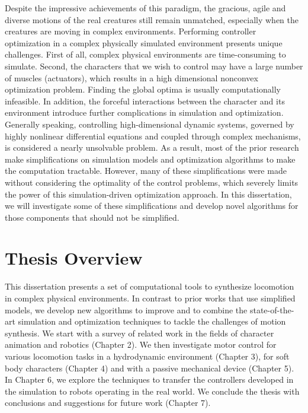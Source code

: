Despite the impressive achievements of this paradigm, the gracious, agile and diverse motions of the real creatures still remain unmatched, especially when the creatures are moving in complex environments. Performing controller optimization in a complex physically simulated environment presents unique challenges. First of all, complex physical environments are time-consuming to simulate. Second, the characters that we wish to control may have a large number of muscles (actuators), which results in a high dimensional nonconvex optimization problem. Finding the global optima is usually computationally infeasible. In addition, the forceful interactions between the character and its environment introduce further complications in simulation and optimization. Generally speaking, controlling high-dimensional dynamic systems, governed by highly nonlinear differential equations and coupled through complex mechanisms, is considered a nearly unsolvable problem. As a result, most of the prior research make simplifications on simulation models and optimization algorithms to make the computation tractable. However, many of these simplifications were made without considering the optimality of the control problems, which severely limits the power of this simulation-driven optimization approach. In this dissertation, we will investigate some of these simplifications and develop novel algorithms for those components that should not be simplified. 


\section{Thesis Overview}

This dissertation presents a set of computational tools to synthesize locomotion in complex physical environments. In contrast to prior works that use simplified models, we develop new algorithms to improve and to combine the state-of-the-art simulation and optimization techniques to tackle the challenges of motion synthesis. We start with a survey of related work in the fields of character animation and robotics (Chapter 2). We then investigate motor control for various locomotion tasks in a hydrodynamic environment (Chapter 3), for soft body characters (Chapter 4) and with a passive mechanical device (Chapter 5). In Chapter 6, we explore the techniques to transfer the controllers developed in the simulation to robots operating in the real world. We conclude the thesis with conclusions and suggestions for future work (Chapter 7).

